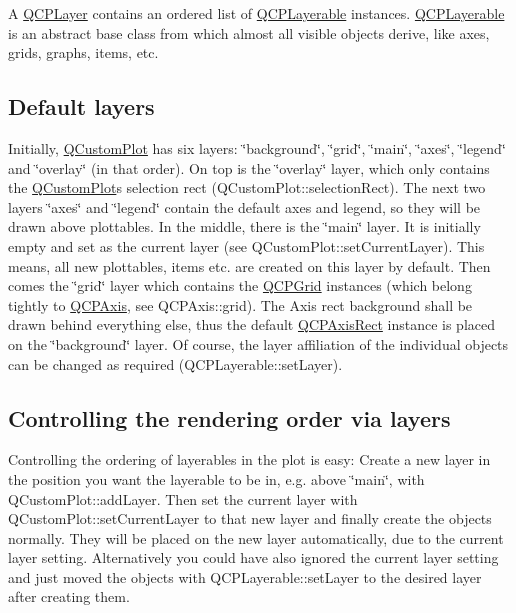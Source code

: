 A \mbox{\hyperlink{class_q_c_p_layer}{Q\+C\+P\+Layer}} contains an ordered list of \mbox{\hyperlink{class_q_c_p_layerable}{Q\+C\+P\+Layerable}} instances. \mbox{\hyperlink{class_q_c_p_layerable}{Q\+C\+P\+Layerable}} is an abstract base class from which almost all visible objects derive, like axes, grids, graphs, items, etc.\hypertarget{class_q_c_p_layer_qcplayer-defaultlayers}{}\subsection{Default layers}\label{class_q_c_p_layer_qcplayer-defaultlayers}
Initially, \mbox{\hyperlink{class_q_custom_plot}{Q\+Custom\+Plot}} has six layers\+: \char`\"{}background\char`\"{}, \char`\"{}grid\char`\"{}, \char`\"{}main\char`\"{}, \char`\"{}axes\char`\"{}, \char`\"{}legend\char`\"{} and \char`\"{}overlay\char`\"{} (in that order). On top is the \char`\"{}overlay\char`\"{} layer, which only contains the \mbox{\hyperlink{class_q_custom_plot}{Q\+Custom\+Plot}}\textquotesingle{}s selection rect (Q\+Custom\+Plot\+::selection\+Rect). The next two layers \char`\"{}axes\char`\"{} and \char`\"{}legend\char`\"{} contain the default axes and legend, so they will be drawn above plottables. In the middle, there is the \char`\"{}main\char`\"{} layer. It is initially empty and set as the current layer (see Q\+Custom\+Plot\+::set\+Current\+Layer). This means, all new plottables, items etc. are created on this layer by default. Then comes the \char`\"{}grid\char`\"{} layer which contains the \mbox{\hyperlink{class_q_c_p_grid}{Q\+C\+P\+Grid}} instances (which belong tightly to \mbox{\hyperlink{class_q_c_p_axis}{Q\+C\+P\+Axis}}, see Q\+C\+P\+Axis\+::grid). The Axis rect background shall be drawn behind everything else, thus the default \mbox{\hyperlink{class_q_c_p_axis_rect}{Q\+C\+P\+Axis\+Rect}} instance is placed on the \char`\"{}background\char`\"{} layer. Of course, the layer affiliation of the individual objects can be changed as required (Q\+C\+P\+Layerable\+::set\+Layer).\hypertarget{class_q_c_p_layer_qcplayer-ordering}{}\subsection{Controlling the rendering order via layers}\label{class_q_c_p_layer_qcplayer-ordering}
Controlling the ordering of layerables in the plot is easy\+: Create a new layer in the position you want the layerable to be in, e.\+g. above \char`\"{}main\char`\"{}, with Q\+Custom\+Plot\+::add\+Layer. Then set the current layer with Q\+Custom\+Plot\+::set\+Current\+Layer to that new layer and finally create the objects normally. They will be placed on the new layer automatically, due to the current layer setting. Alternatively you could have also ignored the current layer setting and just moved the objects with Q\+C\+P\+Layerable\+::set\+Layer to the desired layer after creating them.

